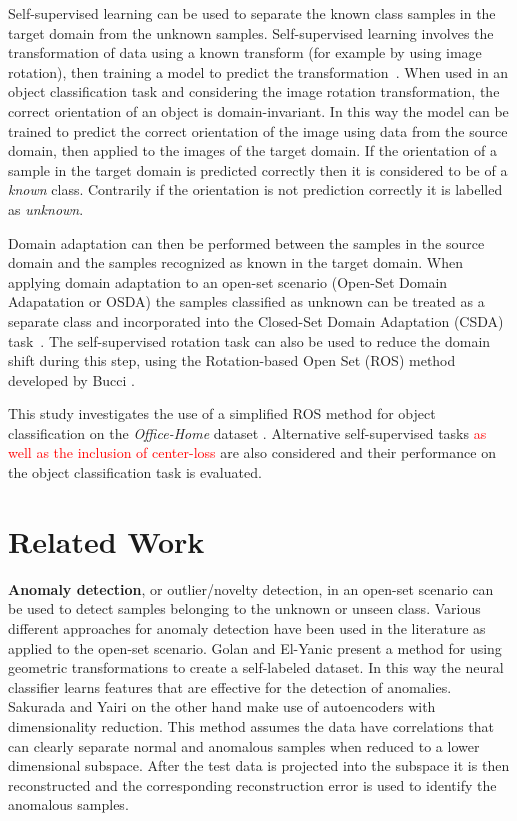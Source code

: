 \documentclass[10pt,twocolumn,letterpaper]{article}
\begin{document}
Self-supervised learning can be used to separate the known class samples in the target domain from the unknown samples. Self-supervised learning involves the transformation of data using a known transform (for example by using image rotation), then training a model to predict the transformation~\cite{Xu2019}. When used in an object classification task and considering the image rotation transformation, the correct orientation of an object is domain-invariant. In this way the model can be trained to predict the correct orientation of the image using data from the source domain, then applied to the images of the target domain. If the orientation of a sample in the target domain is predicted correctly then it is considered to be of a \textit{known} class. Contrarily if the orientation is not prediction correctly it is labelled as \textit{unknown}. 

Domain adaptation can then be performed between the samples in the source domain and the samples recognized as known in the target domain. When applying domain adaptation to an open-set scenario (Open-Set Domain Adapatation or OSDA) the samples classified as unknown can be treated as a separate class and incorporated into the Closed-Set Domain Adaptation (CSDA) task~\cite{Pau2020}. The self-supervised rotation task can also be used to reduce the domain shift during this step, using the Rotation-based Open Set (ROS) method developed by Bucci \etal \cite{Bucci2020}.

This study investigates the use of a simplified ROS method for object classification on the \textit{Office-Home} dataset \cite{OfficeHome}. Alternative self-supervised tasks \textcolor{red}{as well as the inclusion of center-loss} are also considered and their performance on the object classification task is evaluated.


\section{Related Work}
\label{sec:relatedWork}

\textbf{Anomaly detection}, or outlier/novelty detection, in an open-set scenario can be used to detect samples belonging to the unknown or unseen class. Various different approaches for anomaly detection have been used in the literature as applied to the open-set scenario. Golan and El-Yanic \cite{Golan2018} present a method for using geometric transformations to create a self-labeled dataset. In this way the neural classifier learns features that are effective for the detection of anomalies.  Sakurada and Yairi \cite{Sakurada2014} on the other hand make use of autoencoders with dimensionality reduction. This method assumes the data have correlations that can clearly separate normal and anomalous samples when reduced to a lower dimensional subspace. After the test data is projected into the subspace it is then reconstructed and the corresponding reconstruction error is used to identify the anomalous samples.
\end{document}
